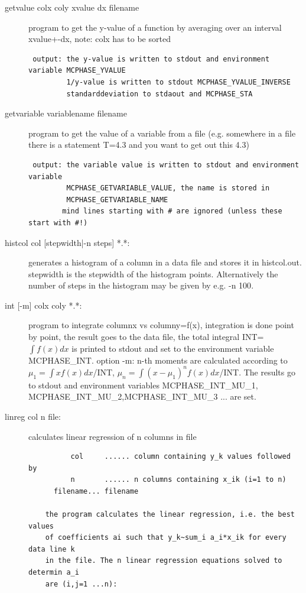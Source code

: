 \begin{description}
\item[\prg getvalue colx coly xvalue dx filename]
program to get the y-value of a function by averaging
 over an interval xvalue+-dx,
 note: colx has to be sorted
\begin{verbatim}
 output: the y-value is written to stdout and environment variable MCPHASE_YVALUE
         1/y-value is written to stdout MCPHASE_YVALUE_INVERSE
         standarddeviation to stdaout and MCPHASE_STA
\end{verbatim}
\item[\prg getvariable variablename filename]
 program to get the value of a variable from a file 
  (e.g. somewhere in a file there is 
   a statement T=4.3 and you want to get out this 4.3)
\begin{verbatim}
 output: the variable value is written to stdout and environment variable 
         MCPHASE_GETVARIABLE_VALUE, the name is stored in 
         MCPHASE_GETVARIABLE_NAME
        mind lines starting with # are ignored (unless these start with #!)
\end{verbatim}
\item[\prg histcol col {[stepwidth|-n steps]} *.*:] generates a histogram of
a column in a data file and stores it in histcol.out. stepwidth is the 
stepwidth of the histogram points. Alternatively the number of
steps in the histogram may be given by e.g. {\prg -n 100}.
\item[\prg int {[-m] }colx coly *.*:]
 program  to integrate columnx vs columny=f(x), integration is done 
point by point, the result goes to the data file, the total integral 
INT=$\int f(x)dx$ is printed to stdout and set to the 
 environment variable MCPHASE\_INT.
 option -m: n-th moments are calculated according to $\mu_1=\int x f(x)dx$/INT, $\mu_n=\int (x-\mu_1)^n f(x)dx$/INT.
The results go to stdout and environment variables MCPHASE\_INT\_MU\_1,
  MCPHASE\_INT\_MU\_2,MCPHASE\_INT\_MU\_3 ... are set.

\item [\prg linreg col n file:] calculates linear regression of n columns in file
\begin{verbatim}
          col     ...... column containing y_k values followed by
          n       ...... n columns containing x_ik (i=1 to n)
	  filename... filename

    the program calculates the linear regression, i.e. the best values
    of coefficients ai such that y_k~sum_i a_i*x_ik for every data line k
    in the file. The n linear regression equations solved to determin a_i
    are (i,j=1 ...n):


\end{verbatim}
\end{description}
